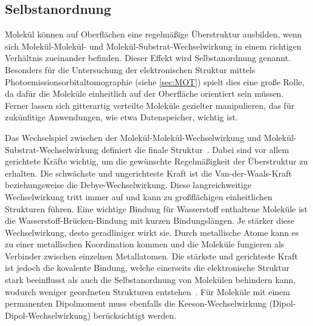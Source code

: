         \subsection{Selbstanordnung} \label{sec:Selbstanordnung}
            Molekül können auf Oberflächen eine regelmäßige Überstruktur ausbilden, wenn sich Molekül-Molekül- und Molekül-Substrat-Wechselwirkung in einem richtigen Verhältnis zueinander befinden.
            Dieser Effekt wird Selbstanordnung genannt.
            Besonders für die Untersuchung der elektronischen Struktur mittels Photoemissionsorbitaltomographie (siehe \autoref{sec:MOT}) spielt dies eine große Rolle, da dafür die Moleküle einheitlich auf der Oberfläche orientiert sein müssen.
            Ferner lassen sich gitterartig verteilte Moleküle gezielter manipulieren, das für zukünfitige Anwendungen, wie etwa Datenspeicher, wichtig ist.
            
            Das Wechselspiel zwischen der Molekül-Molekül-Wechselwirkung und Molekül-Substrat-Wechselwirkung definiert die finale Struktur~\cite{IF_1}.
            Dabei sind vor allem gerichtete Kräfte wichtig, um die gewünschte Regelmäßigkeit der Überstruktur zu erhalten.
            Die schwächste und ungerichteste Kraft ist die Van-der-Waals-Kraft beziehungsweise die Debye-Wechselwirkung. %
            Diese langreichweitige Wechselwirkung tritt immer auf und kann zu großflächigen einheitlichen Strukturen führen.
            Eine wichtige Bindung für Wasserstoff enthaltene Moleküle ist die Wasserstoff-Brücken-Bindung mit kurzen Bindungslängen. %
            Je stärker diese Wechselwirkung, desto geradliniger wirkt sie.
            Durch metallische Atome kann es zu einer metallischen Koordination kommen und die Moleküle fungieren als Verbinder zwischen einzelnen Metallatomen. %
            Die stärkste und gerichteste Kraft ist jedoch die kovalente Bindung, welche einerseits die elektronische Struktur stark beeinflusst als auch die Selbstanordnung von Molekülen behindern kann, wodurch weniger geordneten Strukturen entstehen~\cite{IF_1}.
            Für Moleküle mit einem permanenten Dipolmoment muss ebenfalls die Keeson-Wechselwirkung (Dipol-Dipol-Wechselwirkung) berücksichtigt werden.

